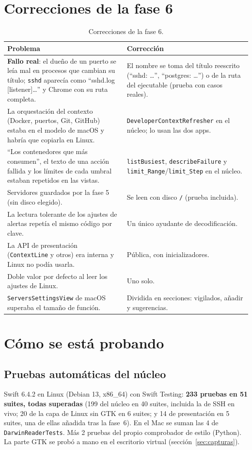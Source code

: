 \documentclass[11pt,a4paper]{article}
\begin{document}
\section{Correcciones de la fase 6}\label{sec:correcciones6}
\begin{table}[H]
\centering
\begin{tabularx}{\textwidth}{@{}XX@{}}
\toprule
\textbf{Problema} & \textbf{Corrección}\\
\midrule
\textbf{Fallo real}: el dueño de un puerto se leía mal en procesos
que cambian su título; \texttt{sshd} aparecía como ``sshd.log
[listener]\ldots'' y Chrome con su ruta completa. & El nombre se
toma del título reescrito (``sshd: \ldots'', ``postgres: \ldots'') o
de la ruta del ejecutable (prueba con casos reales).\\
La orquestación del contexto (Docker, puertos, Git, GitHub) estaba en
el modelo de macOS y habría que copiarla en Linux. &
\texttt{DeveloperContextRefresher} en el núcleo; lo usan las dos
apps.\\
``Los contenedores que más consumen'', el texto de una acción fallida
y los límites de cada umbral estaban repetidos en las vistas. &
\texttt{listBusiest}, \texttt{describeFailure} y
\texttt{limit\_Range}/\texttt{limit\_Step} en el núcleo.\\
Servidores guardados por la fase 5 (sin disco elegido). & Se leen con
disco \texttt{/} (prueba incluida).\\
La lectura tolerante de los ajustes de alertas repetía el mismo
código por clave. & Un único ayudante de decodificación.\\
La API de presentación (\texttt{ContextLine} y otros) era interna y
Linux no podía usarla. & Pública, con inicializadores.\\
Doble valor por defecto al leer los ajustes de Linux. & Uno solo.\\
\texttt{ServersSettingsView} de macOS superaba el tamaño de función.
& Dividida en secciones: vigilados, añadir y sugerencias.\\
\bottomrule
\end{tabularx}
\caption{Correcciones de la fase 6.}
\end{table}

\section{Cómo se está probando}
\subsection{Pruebas automáticas del núcleo}
Swift 6.4.2 en Linux (Debian 13, x86\_64) con Swift Testing:
\textbf{233 pruebas en 51 suites, todas superadas} (199 del núcleo
en 40 suites, incluida la de SSH en vivo; 20 de la capa de Linux sin
GTK en 6 suites; y 14 de presentación en 5 suites, una de ellas
añadida tras la fase~6). En el Mac se suman las 4 de
\texttt{DarwinReaderTests}. Más 2 pruebas del
propio comprobador de estilo (Python). La parte GTK se probó a mano en
el escritorio virtual (sección~\ref{sec:capturas}).
\end{document}
